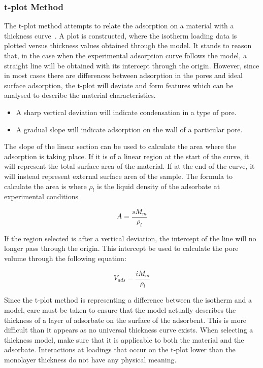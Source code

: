\subsubsection{t-plot Method}

The t-plot method attempts to relate the adsorption on a material
with a thickness curve~\cite{lippensStudiesPoreSystems1965}. 
A plot is constructed, where the isotherm loading
data is plotted versus thickness values obtained through the model.
It stands to reason that, in the case when the experimental adsorption
curve follows the model, a straight line will be obtained with its
intercept through the origin. However, since in most cases there
are differences between adsorption in the pores and ideal surface
adsorption, the t-plot will deviate and form features which can
be analysed to describe the material characteristics.

\begin{itemize}

	\item A sharp vertical deviation will indicate condensation
	      in a type of pore.
	\item A gradual slope will indicate adsorption on the
	      wall of a particular pore.

\end{itemize}

The slope of the linear section can be used to calculate the area where
the adsorption is taking place. If it is of a linear region at the start
of the curve, it will represent the total surface area of the material.
If at the end of the curve, it will instead represent external surface
area of the sample. The formula to calculate the area is
where \(\rho_{l}\) is the liquid density of the adsorbate at experimental
conditions

\begin{equation}
	A = \frac{s M_m}{\rho_{l}}
\end{equation}

If the region selected is after a vertical deviation, the intercept of the line
will no longer pass through the origin. This intercept be used to calculate the
pore volume through the following equation:

\begin{equation}
	V_{ads} = \frac{i M_m}{\rho_{l}}
\end{equation}

Since the t-plot method is representing a difference between the
isotherm and a model, care must be taken to ensure that the model
actually describes the thickness of a layer of adsorbate on the
surface of the adsorbent. This is more difficult than it
appears as no universal thickness curve exists.
When selecting a thickness model, make sure that it is applicable
to both the material and the adsorbate.
Interactions at loadings that occur on the t-plot lower than the monolayer
thickness do not have any physical meaning.

